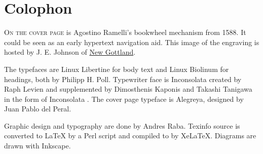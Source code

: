 \chapter*{Colophon}
\label{Colophon}

\lettrine{O}{n the cover page} is Agostino Ramelli's bookwheel mechanism from 1588. It could be seen as an early hypertext navigation aid. This image of the engraving is hosted by J. E. Johnson of \href{http://newgottland.com/2012/02/09/before-the-ereader-there-was-the-wheelreader/ramelli_bookwheel_1032px/}{New Gottland}.

The typefaces are Linux Libertine for body text and Linux Biolinum for headings, both by Philipp H. Poll. Typewriter face is Inconsolata created by Raph Levien and supplemented by Dimosthenis Kaponis and Takashi Tanigawa in the form of Inconsolata . The cover page typeface is Alegreya, designed by Juan Pablo del Peral.

Graphic design and typography are done by Andres Raba. Texinfo source is converted to LaTeX by a Perl script and compiled to  by XeLaTeX. Diagrams are drawn with Inkscape.
